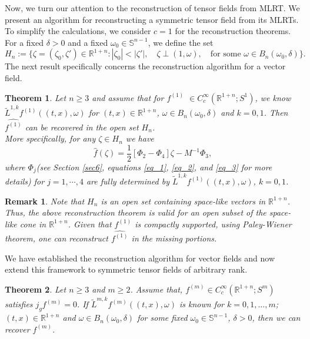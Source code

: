 \documentclass[11pt,a4paper,reqno]{amsart}
\newtheorem{theorem}{Theorem}
\newtheorem{remark}[definition]{Remark}
\newcommand{\R}{\mathbb{R}}
\newcommand{\Bdl}{B_{n}(\omega_0,\delta)}
\newcommand{\om}{\omega}
\newcommand{\sn}{\mathbb{S}^{n-1}}
\begin{document}
	Now, we turn our attention to the reconstruction of tensor fields from MLRT. We present an algorithm for reconstructing a symmetric tensor field from its MLRTs. To simplify the calculations, we consider $c=1$ for the reconstruction theorems. For a fixed $\delta>0$ and a fixed $\om_0 \in \sn$, we define the set
	\[
	H_n := \{\zeta=(\zeta_0,\zeta') \in \R^{1+n}: |\zeta_0|<|\zeta'|, \quad \zeta \perp (1,\om), \quad \text{for some }\om \in \Bdl \}. \]
	The next result specifically concerns the reconstruction algorithm for a vector field.
	\begin{theorem}\label{rec_roof_fn}
		Let $n\geq 3$ and assume that for $f^{(1)}$ $\in C_{c}^{\infty}(\mathbb{R}^{1+n};S^{1})$, we know $\tilde{L}^{1,k}f^{(1)}((t,x),\omega )$ for $(t,x)\in \mathbb{R}^{1+n}$, $\omega \in B_{n}(\omega_0,\delta)$ and $k=0,1$. Then $\widehat{f^{(1)}}$ can be recovered in the open set $H_n$.\\
		More specifically, for any $\zeta \in H_n$ we have
		\[
		\hat{f}(\zeta)
		=\frac{1}{2}[\Phi_2-\Phi_4]\zeta - M^{-1}\Phi_3,
		\]
		where $\Phi_j$(see Section \ref{sec6}, equations \eqref{eq_1}, \eqref{eq_2}, and \eqref{eq_3} for more details) for $j=1,\cdots,4$ are fully determined by $\tilde{L}^{1,k}f^{(1)}((t,x),\omega)$, $k=0,1$. 
	\end{theorem}
	\begin{remark}\label{reconstruction_analytic-cont.}
	Note that $H_n$ is an open set containing space-like vectors in $\R^{1+n}$. Thus, the above reconstruction theorem is valid for an open subset of the space-like cone in $\R^{1+n}$. Given that $f^{(1)}$ is compactly supported, using Paley-Wiener theorem, one can reconstruct $\widehat{f^{(1)}}$ in the missing portions.
	\end{remark}

We have established the reconstruction algorithm for vector fields and now extend this framework to symmetric tensor fields of arbitrary rank.
	\begin{theorem}\label{rec_mt}
		Let $n\geq 3$ and $m\geq 2$. Assume that, $f^{(m)}  \in C_{c}^{\infty}(\mathbb{R}^{1+n};S^m)$ satisfies $j_{g}f^{(m)} = 0$. If $\tilde{L}^{m,k}f^{(m)}((t,x),\omega)$ is known for $k=0,1,\dots ,m$; $(t,x)\in \mathbb{R}^{1+n}$ and $\omega \in B_{n}(\omega_0,\delta)$ for some fixed $\omega_0 \in \mathbb{S}^{n-1}$, $\delta >0$, then we can recover $f^{(m)}$.
	\end{theorem}
\end{document}
